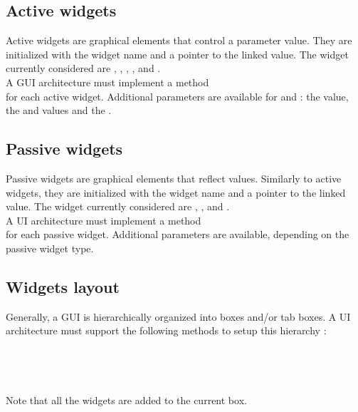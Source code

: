 \subsection{Active widgets}
\label{sec:awidget}
Active widgets are graphical elements that control a parameter value. They are initialized with the widget name and a pointer to the linked value.
The widget currently considered are ,  ,  ,  ,   and  . \\
A GUI architecture must implement a method \\
 for each active widget.
Additional parameters are available for  and : the  value, the  and  values and the .

\subsection{Passive widgets}
\label{sec:pwidget}
Passive widgets are graphical elements that reflect values. Similarly to active widgets, they are initialized with the widget name and a pointer to the linked value.
The widget currently considered are ,  ,   and  . \\
A UI architecture must implement a method \\
 for each passive widget.
Additional parameters are available, depending on the passive widget type.

\subsection{Widgets layout}
\label{sec:wlayout}
Generally, a  GUI is hierarchically organized into boxes and/or tab boxes. 
A UI architecture must support the following methods to setup this hierarchy : \\
\htab{} \\
\htab{} \\
\htab{} \\
\htab{} \\
Note that all the widgets are added to the current box.

